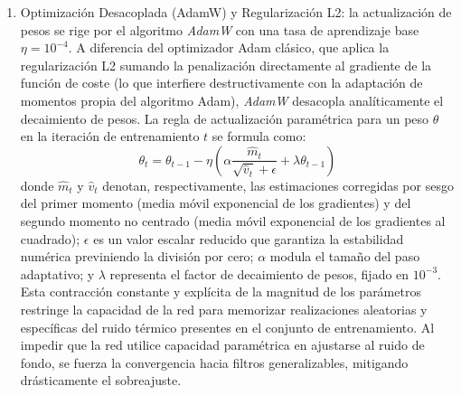 \begin{enumerate}
    \item Optimización Desacoplada (AdamW) y Regularización L2:
    la actualización de pesos se rige por el algoritmo \textit{AdamW} \cite{loshchilov_decoupled_2019} con una tasa de aprendizaje base $\eta = 10^{-4}$. A diferencia del optimizador Adam clásico, que aplica la regularización L2 sumando la penalización directamente al gradiente de la función de coste (lo que interfiere destructivamente con la adaptación de momentos propia del algoritmo Adam), \textit{AdamW} desacopla analíticamente el decaimiento de pesos. La regla de actualización paramétrica para un peso $\theta$ en la iteración de entrenamiento $t$ se formula como:
    \begin{equation}
        \theta_{t} = \theta_{t-1} - \eta \left( \alpha \frac{\hat{m}_t}{\sqrt{\hat{v}_t} + \epsilon} + \lambda \theta_{t-1} \right)
    \end{equation}
    donde $\hat{m}_t$ y $\hat{v}_t$ denotan, respectivamente, las estimaciones corregidas por sesgo del primer momento (media móvil exponencial de los gradientes) y del segundo momento no centrado (media móvil exponencial de los gradientes al cuadrado); $\epsilon$ es un valor escalar reducido que garantiza la estabilidad numérica previniendo la división por cero; $\alpha$ modula el tamaño del paso adaptativo; y $\lambda$ representa el factor de decaimiento de pesos, fijado en $10^{-3}$. Esta contracción constante y explícita de la magnitud de los parámetros restringe la capacidad de la red para memorizar realizaciones aleatorias y específicas del ruido térmico presentes en el conjunto de entrenamiento. Al impedir que la red utilice capacidad paramétrica en ajustarse al ruido de fondo, se fuerza la convergencia hacia filtros generalizables, mitigando drásticamente el sobreajuste.


\end{enumerate}
